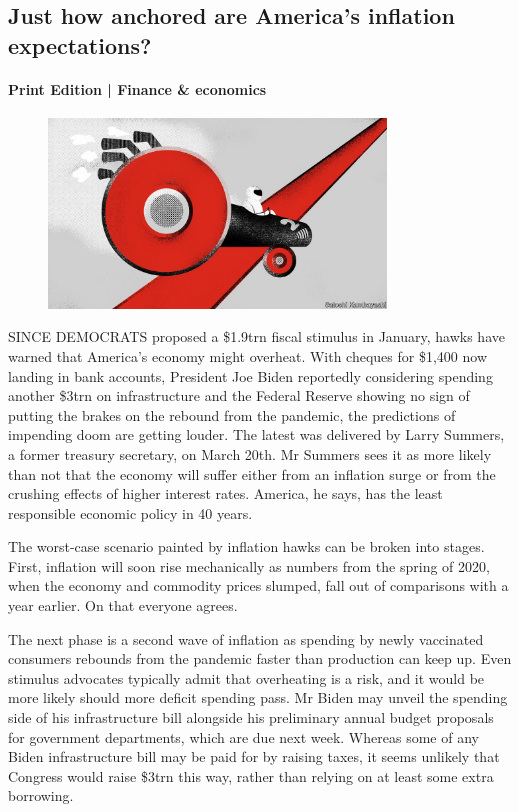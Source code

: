 \documentclass{article}
\begin{document}
\subsection{Just how anchored are America's inflation expectations? }
\paragraph{Print Edition | Finance \& economics  \quad \color{gray}{Mar 25th 2021 }}
\begin{figure}[h]
\centering
\includegraphics[width=0.8\textwidth]{images/20210327_fnd001.jpg}
\end{figure}
\lettrine{S}INCE DEMOCRATS proposed a \$1.9trn fiscal stimulus in January, hawks have warned that America's economy might overheat. With cheques for \$1,400 now landing in bank accounts, President Joe Biden reportedly considering spending another \$3trn on infrastructure and the Federal Reserve showing no sign of putting the brakes on the rebound from the pandemic, the predictions of impending doom are getting louder. The latest was delivered by Larry Summers, a former treasury secretary, on March 20th. Mr Summers sees it as more likely than not that the economy will suffer either from an inflation surge or from the crushing effects of higher interest rates. America, he says, has the least responsible economic policy in 40 years. 

The worst-case scenario painted by inflation hawks can be broken into stages. First, inflation will soon rise mechanically as numbers from the spring of 2020, when the economy and commodity prices slumped, fall out of comparisons with a year earlier. On that everyone agrees. 

The next phase is a second wave of inflation as spending by newly vaccinated consumers rebounds from the pandemic faster than production can keep up. Even stimulus advocates typically admit that overheating is a risk, and it would be more likely should more deficit spending pass. Mr Biden may unveil the spending side of his infrastructure bill alongside his preliminary annual budget proposals for government departments, which are due next week. Whereas some of any Biden infrastructure bill may be paid for by raising taxes, it seems unlikely that Congress would raise \$3trn this way, rather than relying on at least some extra borrowing. 
\end{document}
